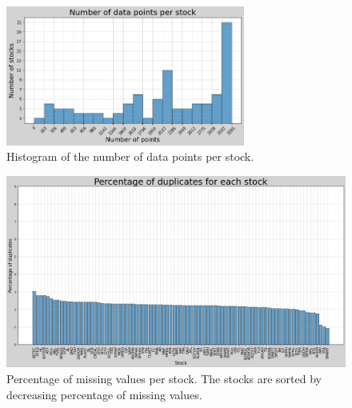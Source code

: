 \documentclass[11pt]{article}
\begin{document}
\begin{figure}[H]
    \centering
    \includegraphics[width=0.7\textwidth]{figures/preprocessing/histogram_size.png}
    \caption{Histogram of the number of data points per stock.}
    \label{fig:histogram_size}
\end{figure}

\begin{figure}[H]
    \centering
    \begin{minipage}[t]{0.75\textwidth}
    \includegraphics[width=\textwidth]{figures/preprocessing/bar_duplicates.png}
    \caption{Percentage of missing values per stock. The stocks are sorted by decreasing percentage of missing values.}
    \label{fig:bar_duplicates}
    \end{minipage}
\end{figure}
\end{document}
